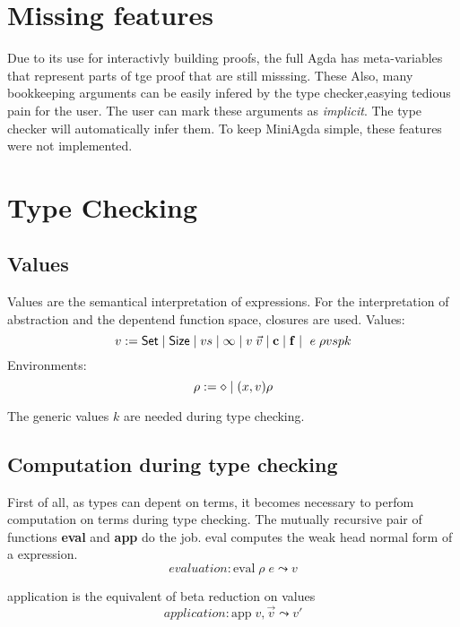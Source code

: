 \section{Missing features}
Due to its use for interactivly building proofs, the full Agda has meta-variables that represent parts of tge proof that are still misssing. These 
Also, many bookkeeping arguments can be easily infered by the type checker,easying tedious pain for the user.
The user can mark these arguments as \emph{implicit}. The type checker will automatically infer them.
To keep MiniAgda simple, these features were not implemented.

\section{Type Checking}

\renewcommand\Check[4]{#1,#2\;\vdash\;#3\uparrow#4}
\newcommand\Infer[4]{#1,#2\;\vdash\;#3\downarrow#4}
\newcommand\IsType[3]{#1,#2\;\vdash\;#3\uparrow\Set}
\newcommand\EqVal[2]{\vdash\;#1\leftrightarrow#2}
\newcommand\Eval[3]{\mathrm{eval}\;#1\;#2\leadsto#3}
\newcommand\App[3]{\mathrm{app}\;#1,#2\leadsto#3}
\newcommand\AppFun[3]{\mathrm{appFun}\;#1,#2,\leadsto#3}
\newcommand\Fapp[6]{\mathrm{fapp}\;#1,#2,#3,#4,#5\leadsto#6}
\newcommand\Whnf[2]{\mathrm{whnf}\;#1\leadsto#2}
\newcommand\Lookup[3]{#1(#2) = #3}
\newcommand\LeqVal[2]{\vdash\;#1\leq#2}
\subsection{Values}
Values are the semantical interpretation of expressions.
For the interpretation of abstraction and the depentend function space, closures are used.
Values:
\[ v := \mathsf{Set} \;\vert\; \mathsf{Size} \;\vert\; vs \;\vert\; \infty \;\vert\; v \; \vec{v} \;\vert\; \mathbf{c} \;\vert\; \mathbf{f} \;\vert\; \ e \; \rho vsp k \]
Environments:
\[ \rho := \diamond \;\vert\; (x,v) \rho \]

The generic values $k$ are needed during type checking.
\subsection{Computation during type checking}
First of all, as types can depent on terms, it becomes necessary to perfom computation on terms during type checking.
The mutually recursive pair of functions 
\textbf{eval} and \textbf{app} do the job.
eval computes the weak head normal form of a expression.
\[ evaluation : \Eval{\rho}{e}{v}\]

application is the equivalent of beta reduction on values
\[ application : \App{v}{\vec{v}}{v'}\]


